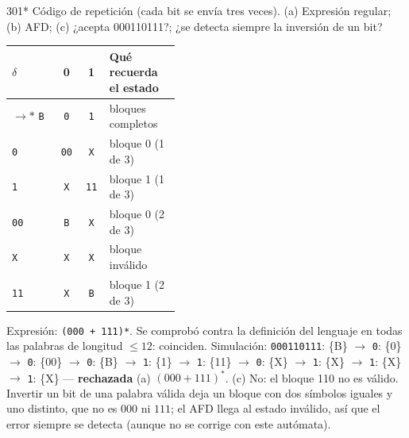 \documentclass[11pt]{article}
\begin{document}
\begin{ejercicio}{301}{*}
Código de repetición (cada bit se envía tres veces). (a) Expresión regular; (b) AFD; (c) ¿acepta 000110111?; ¿se detecta siempre la inversión de un bit?
\end{ejercicio}
\proc \begin{center}\small\begin{tabular}{lccp{0.42\linewidth}}\toprule
$\delta$ & 0 & 1 & Qué recuerda el estado \\\midrule
$\to$$*$ \texttt{B} & \texttt{0} & \texttt{1} & bloques completos \\
 \texttt{0} & \texttt{00} & \texttt{X} & bloque 0 (1 de 3) \\
 \texttt{1} & \texttt{X} & \texttt{11} & bloque 1 (1 de 3) \\
 \texttt{00} & \texttt{B} & \texttt{X} & bloque 0 (2 de 3) \\
 \texttt{X} & \texttt{X} & \texttt{X} & bloque inválido \\
 \texttt{11} & \texttt{X} & \texttt{B} & bloque 1 (2 de 3) \\
\bottomrule\end{tabular}\end{center}
\par Expresión: \texttt{(000 + 111)*}. Se comprobó contra la definición del lenguaje en todas las palabras de longitud $\le 12$: coinciden.
Simulación: \texttt{000110111}: \{B\} $\to$ \texttt{0}: \{0\} $\to$ \texttt{0}: \{00\} $\to$ \texttt{0}: \{B\} $\to$ \texttt{1}: \{1\} $\to$ \texttt{1}: \{11\} $\to$ \texttt{0}: \{X\} $\to$ \texttt{1}: \{X\} $\to$ \texttt{1}: \{X\} $\to$ \texttt{1}: \{X\} — \textbf{rechazada}
\resp (a) $(000 + 111)^*$. (c) No: el bloque 110 no es válido. Invertir un bit de una palabra válida deja un bloque con dos símbolos iguales y uno distinto, que no es $000$ ni $111$; el AFD llega al estado inválido, así que el error siempre se detecta (aunque no se corrige con este autómata).
\end{document}
